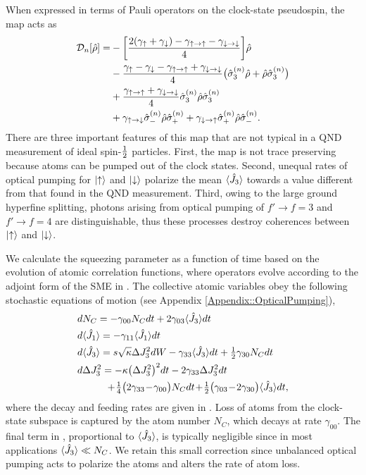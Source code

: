 \documentclass[aps,pra,twocolumn]{revtex4-1} %
\newcommand{\half}{\smallfrac{1}{2}}
\newcommand{\varz}{\Delta J_3^2}
\newcommand{\jz}{\hat{J}_3}
\newcommand{\gammauu}{\gamma_{\uparrow \rightarrow \uparrow}}
\newcommand{\gammadd}{\gamma_{\downarrow \rightarrow \downarrow}}
\newcommand{\gammaud}{\gamma_{\uparrow \rightarrow \downarrow}}
\newcommand{\gammadu}{\gamma_{\downarrow \rightarrow \uparrow}}
\newcommand{\gammau}{\gamma_{\uparrow}}
\newcommand{\gammad}{\gamma_{\downarrow}}
\begin{document}
When expressed in terms of Pauli operators on the clock-state pseudospin, the map acts as
	\begin{align} \label{Eq::OpticalPumpingMapSchr}
		\mathcal{D}_n [\hat{\rho}] 
				=& - \bigg[ \frac{2(\gammau+ \gammad) - \gammauu - \gammadd}{4} \bigg] \hat{\rho} \nn\\
				&- \frac{ \gammau - \gammad - \gammauu + \gammadd }{4} \big( \hat{\sigma}_3^{(n)} \hat{\rho}+ \hat{\rho} \hat{\sigma}_3^{(n)} \big) \nn \\
		&+ \frac{\gammauu+\gammadd}{4} \hat{\sigma}_ 3^{(n)}\hat{\rho} \hat{\sigma}_3^{(n)} \nn\\
		&+ \gammaud  \hat{\sigma}_-^{(n)} \hat{\rho} \hat{\sigma}_+^{(n)} + \gammadu  \hat{\sigma}_+^{(n)} \hat{\rho} \hat{\sigma}_- ^{(n)}.   
	\end{align} 
There are three important features of this map that are not typical in a QND measurement of ideal spin-$\half$ particles.  
First, the map is not trace preserving because atoms can be pumped out of the clock states. 
Second, unequal rates of optical pumping for $\lvert{\uparrow}\rangle$ and $\lvert{\downarrow}\rangle$ polarize the mean $\expt{\jz}$ towards a value different from that found in the QND measurement. 
Third, owing to the large ground hyperfine splitting, photons arising from optical pumping of $f' \rightarrow f=3$ and $f' \rightarrow f=4$ are distinguishable, thus these processes destroy coherences between $\lvert{\uparrow}\rangle$ and $\lvert{\downarrow}\rangle$. 

We calculate the squeezing parameter as a function of time based on the evolution of atomic correlation functions, where operators evolve according to the adjoint form of the SME in .  The collective atomic variables obey the following stochastic equations of motion (see Appendix \ref{Appendix::OpticalPumping}),
	\begin{align} 
		&d N_C = -\gamma_{00} N_C dt + 2\gamma_{03} \expt{\hat{J}_3} dt \label{Eq::NA}\\
		&d \expt{\hat{J}_1}  = -\gamma_{11} \expt{\hat{J}_1} dt  \label{Eq::MeanSpinDecay} \\
		&d \expt{\hat{J}_3}  = s\sqrt{\kappa} \varz dW -\gamma_{33} \expt{\hat{J}_3}dt + \smallfrac{1}{2}\gamma_{30} N_C dt   \\
		&d \varz  = - \kappa \big(\varz\big)^2 dt- 2 \gamma_{33} \varz dt \nn\\
		&\quad\quad\quad \!+\! \smallfrac{1}{4} \big( 2\gamma_{33}\!-\!\gamma_{00} \big) N_C dt \!+\! \smallfrac{1}{2} \big( \gamma_{03} \!-\! 2 \gamma_{30} \big) \expt{\hat{J}_3} dt,   \label{Eq::varJz} 
	\end{align}
where the decay and feeding rates are given in .
Loss of atoms from the clock-state subspace is captured by the atom number $N_C$, which decays at rate $\gamma_{00}$. 
The final term in , proportional to $\langle{\hat{J}_3}\rangle$, is typically negligible since in most applications $\langle{\hat{J}_3}\rangle \ll N_C$.  
We retain this small correction since unbalanced optical pumping acts to polarize the atoms and alters the rate of atom loss.  
\end{document}
